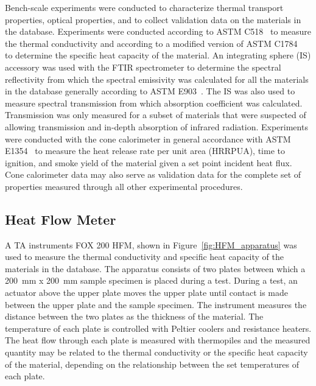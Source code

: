 \documentclass[12pt,oneside]{book}
\begin{document}
Bench-scale experiments were conducted to characterize thermal transport properties, optical properties, and to collect validation data on the materials in the database. Experiments were conducted according to ASTM C518~\cite{ASTM_C518} to measure the thermal conductivity and according to a modified version of ASTM C1784~\cite{ASTM_C1784} to determine the specific heat capacity of the material. An integrating sphere (IS) accessory was used with the FTIR spectrometer to determine the spectral reflectivity from which the spectral emissivity was calculated for all the materials in the database generally according to ASTM E903~\cite{ASTM_E903}. The IS was also used to measure spectral transmission from which absorption coefficient was calculated. Transmission was only measured for a subset of materials that were suspected of allowing transmission and in-depth absorption of infrared radiation. Experiments were conducted with the cone calorimeter in general accordance with ASTM E1354~\cite{ASTM_E1354} to measure the heat release rate per unit area (HRRPUA), time to ignition, and smoke yield of the material given a set point incident heat flux. Cone calorimeter data may also serve as validation data for the complete set of properties measured through all other experimental procedures.

\subsection{Heat Flow Meter}
\label{sec:hfm}

A TA instruments FOX 200 HFM, shown in Figure~\ref{fig:HFM_apparatus} was used to measure the thermal conductivity and specific heat capacity of the materials in the database. The apparatus consists of two plates between which a 200~mm x 200~mm sample specimen is placed during a test. During a test, an actuator above the upper plate moves the upper plate until contact is made between the upper plate and the sample specimen. The instrument measures the distance between the two plates as the thickness of the material. The temperature of each plate is controlled with Peltier coolers and resistance heaters. The heat flow through each plate is measured with thermopiles and the measured quantity may be related to the thermal conductivity or the specific heat capacity of the material, depending on the relationship between the set temperatures of each plate.
\end{document}
